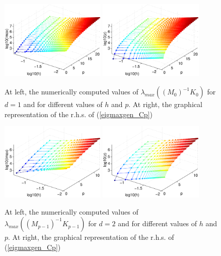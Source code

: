 \documentclass[11pt]{article}
\begin{document}
\begin{figure}[h]
\begin{center}
\includegraphics[width=0.45\textwidth]{Images/igap_eiggen1max.eps}\quad
\includegraphics[width=0.45\textwidth]{Images/igap_eiggen1smax.eps}
\end{center}
\caption{At left, the numerically computed values of
$\lambda_{max}((M_0)^{-1}K_0)$ for $d=1$ and
for different values of $h$ and $p$. At right,
the graphical representation of the r.h.s. of (\ref{eigmaxgen_Cp})}
\label{fig:genmax-igapd1}
\end{figure}

\begin{figure}
\begin{center}
\includegraphics[width=0.45\textwidth]{Images/igap_eiggen2max.eps}\quad
\includegraphics[width=0.45\textwidth]{Images/igap_eiggen2smax.eps}
\end{center}
\caption{At left, the numerically computed values of
$\lambda_{max}((M_{p-1})^{-1}K_{p-1})$ for $d=2$ and
for different values of $h$ and $p$. At right,
the graphical representation of the r.h.s. of (\ref{eigmaxgen_Cp})}
\label{fig:genmax-igapd2}
\end{figure}
\end{document}
